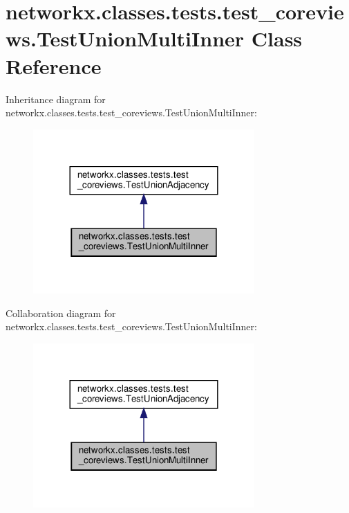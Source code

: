 \hypertarget{classnetworkx_1_1classes_1_1tests_1_1test__coreviews_1_1TestUnionMultiInner}{}\section{networkx.\+classes.\+tests.\+test\+\_\+coreviews.\+Test\+Union\+Multi\+Inner Class Reference}
\label{classnetworkx_1_1classes_1_1tests_1_1test__coreviews_1_1TestUnionMultiInner}


Inheritance diagram for networkx.\+classes.\+tests.\+test\+\_\+coreviews.\+Test\+Union\+Multi\+Inner\+:
\nopagebreak
\begin{figure}[H]
\begin{center}
\leavevmode
\includegraphics[width=240pt]{classnetworkx_1_1classes_1_1tests_1_1test__coreviews_1_1TestUnionMultiInner__inherit__graph}
\end{center}
\end{figure}


Collaboration diagram for networkx.\+classes.\+tests.\+test\+\_\+coreviews.\+Test\+Union\+Multi\+Inner\+:
\nopagebreak
\begin{figure}[H]
\begin{center}
\leavevmode
\includegraphics[width=240pt]{classnetworkx_1_1classes_1_1tests_1_1test__coreviews_1_1TestUnionMultiInner__coll__graph}
\end{center}
\end{figure}
